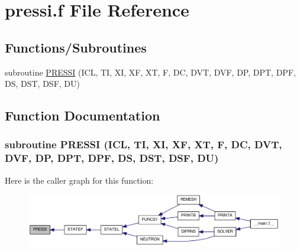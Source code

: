 \hypertarget{pressi_8f}{
\section{pressi.f File Reference}
\label{pressi_8f}
}
\subsection*{Functions/Subroutines}
\begin{DoxyCompactItemize}
\item 
subroutine \hyperlink{pressi_8f_a881d56bd249d693d3f6fd21027e86dd1}{PRESSI} (ICL, TI, XI, XF, XT, F, DC, DVT, DVF, DP, DPT, DPF, DS, DST, DSF, DU)
\end{DoxyCompactItemize}


\subsection{Function Documentation}
\hypertarget{pressi_8f_a881d56bd249d693d3f6fd21027e86dd1}{
\subsubsection[{PRESSI}]{\setlength{\rightskip}{0pt plus 5cm}subroutine PRESSI (ICL, \/  TI, \/  XI, \/  XF, \/  XT, \/  F, \/  DC, \/  DVT, \/  DVF, \/  DP, \/  DPT, \/  DPF, \/  DS, \/  DST, \/  DSF, \/  DU)}}
\label{pressi_8f_a881d56bd249d693d3f6fd21027e86dd1}


Here is the caller graph for this function:\nopagebreak
\begin{figure}[H]
\begin{center}
\leavevmode
\includegraphics[width=333pt]{pressi_8f_a881d56bd249d693d3f6fd21027e86dd1_icgraph}
\end{center}
\end{figure}
